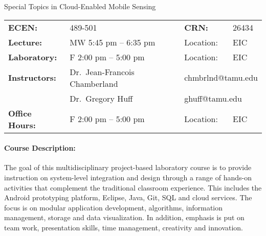 \documentclass[letterpaper,11pt]{article}
\begin{document}
\begin{center}
{\LARGE \sc Special Topics in Cloud-Enabled Mobile Sensing\\[5mm]}
\end{center}

\begin{center}
\begin{tabular}{llll}
\textbf{ECEN:} & 489-501 & \textbf{CRN:} & 26434 \tabularnewline
\textbf{Lecture:} & MW 5:45 pm -- 6:35 pm & {Location:} & EIC \tabularnewline
\textbf{Laboratory:} & F 2:00 pm -- 5:00 pm & {Location:} & EIC \tabularnewline
\textbf{Instructors:} & Dr.~Jean-Francois Chamberland & \multicolumn{2}{l}{chmbrlnd@tamu.edu} \tabularnewline
& Dr.~Gregory Huff & \multicolumn{2}{l}{ghuff@tamu.edu} \tabularnewline
\textbf{Office Hours:} & F 2:00 pm -- 5:00 pm & {Location:} & EIC \tabularnewline
\end{tabular}
\end{center}

\paragraph{Course Description:}
The goal of this multidisciplinary project-based laboratory course is to provide instruction on system-level integration and design through a range of hands-on activities that complement the traditional classroom experience.
This includes the Android prototyping platform, Eclipse, Java, Git, SQL and cloud services.
The focus is on modular application development, algorithms, information management, storage and data visualization.
In addition, emphasis is put on team work, presentation skills, time management, creativity and innovation.
\end{document}
